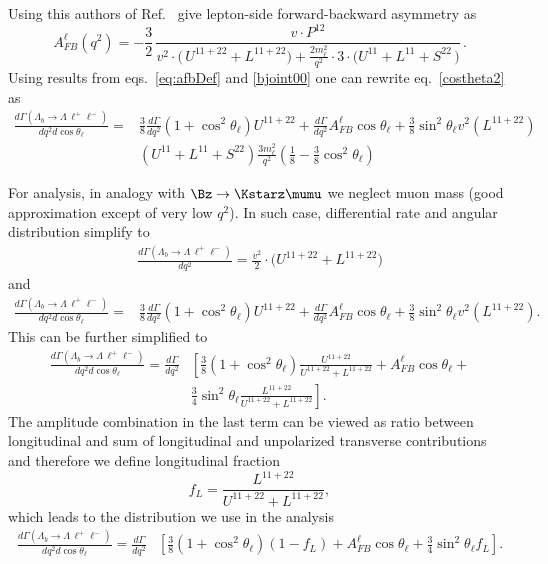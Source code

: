 Using this authors of Ref.~\cite{Gutsche:2013pp} give lepton-side forward-backward asymmetry as
\begin{equation}
A_{FB}^{\ell}(q^{2}) 
= - \frac{3}{2}\,\frac{v\cdot P^{12}}
{v^{2}\cdot\big(\,U^{11+22}
+L^{11+22}\big)+\frac{2m_{\ell}^{2}}{q^{2}}\cdot 3 \cdot
\big(U^{11}+L^{11}
+S^{22}\,\big) }\,.
\label{eq:afbDef}
\end{equation}
Using results from eqs.~\ref{eq:afbDef} and \ref{bjoint00} one can rewrite eq.~\ref{costheta2} as
\begin{align}
\frac{d\Gamma(\Lambda_{b}\to \Lambda \,\ell^{+}\ell^{-})}{dq^2d\cos\theta_\ell}=&
\frac{3}{8}\frac{d\Gamma}{dq^2}\left(1+\cos^2\theta_\ell\right)U^{11+22}+
\frac{d\Gamma}{dq^2}A_{FB}^\ell\cos\theta_\ell+
\frac{3}{8}\sin^2\theta_\ell v^2\left(L^{11+22}\right) \nonumber \\
&\left(U^{11}+L^{11}+S^{22}\right)\frac{3m_\ell^2}{q^2}\left(\frac{1}{8}-\frac{3}{8}\cos^2\theta_\ell\right)
\end{align}
 
For analysis, in analogy with $\Bz\to\Kstarz\mumu$ we neglect muon mass (good approximation except of
very low $q^2$). In such case, differential rate and angular distribution simplify to
\begin{eqnarray}
\frac{d\Gamma(\Lambda_b \to \Lambda \,\ell^{+}\ell^{-})}{d q^2}=
\frac{v^{2}}{2}\cdot\bigg( U^{11+22} + L^{11+22} \bigg)
\end{eqnarray}
and
\begin{align}
\frac{d\Gamma(\Lambda_{b}\to \Lambda \,\ell^{+}\ell^{-})}{dq^2d\cos\theta_\ell}=&
\frac{3}{8}\frac{d\Gamma}{dq^2}\left(1+\cos^2\theta_\ell\right)U^{11+22}+
\frac{d\Gamma}{dq^2}A_{FB}^\ell\cos\theta_\ell+
\frac{3}{8}\sin^2\theta_\ell v^2\left(L^{11+22}\right). 
\end{align}
This can be further simplified to
\begin{align}
\frac{d\Gamma(\Lambda_{b}\to \Lambda \,\ell^{+}\ell^{-})}{dq^2d\cos\theta_\ell}=
\frac{d\Gamma}{dq^2}&\left[
\frac{3}{8}\left(1+\cos^2\theta_\ell\right)\frac{U^{11+22}}{U^{11+22}+L^{11+22}}+A_{FB}^\ell\cos\theta_\ell\right . +
 \nonumber \\
& \left. \frac{3}{4}\sin^2\theta_\ell\frac{L^{11+22}}{U^{11+22}+L^{11+22}}\right].
\end{align}
The amplitude combination in the last term can be viewed as ratio between longitudinal and sum of
longitudinal and unpolarized transverse contributions and therefore we define longitudinal fraction 
\begin{equation}
f_L=\frac{L^{11+22}}{U^{11+22}+L^{11+22}},
\end{equation}
which leads to the distribution we use in the analysis
\begin{align}
\frac{d\Gamma(\Lambda_{b}\to \Lambda \,\ell^{+}\ell^{-})}{dq^2d\cos\theta_\ell}=
\frac{d\Gamma}{dq^2}&\left[  \frac{3}{8}\left(1+\cos^2\theta_\ell\right)(1-f_L)+A_{FB}^\ell\cos\theta_\ell +
   \frac{3}{4}\sin^2\theta_\ell f_L\right]. 
\end{align}


